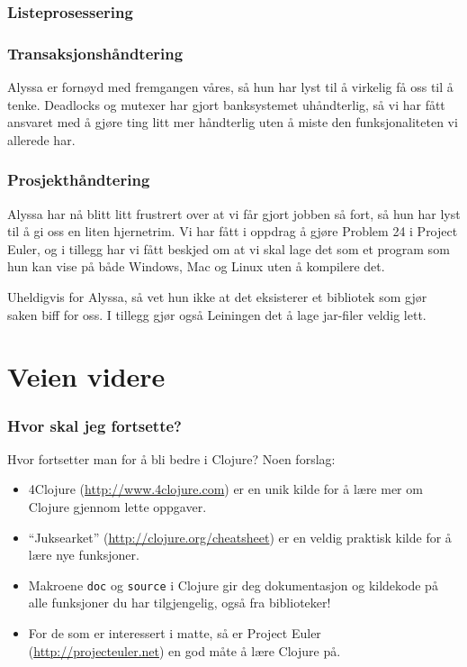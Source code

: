 \documentclass{beamer}
\begin{document}
\begin{frame}
  \frametitle{Listeprosessering}

\end{frame}

\begin{frame}
  \frametitle{Transaksjonshåndtering}

  Alyssa er fornøyd med fremgangen våres, så hun har lyst til å virkelig få oss
  til å tenke. Deadlocks og mutexer har gjort banksystemet uhåndterlig, så vi
  har fått ansvaret med å gjøre ting litt mer håndterlig uten å miste den
  funksjonaliteten vi allerede har.
\end{frame}

\begin{frame}
  \frametitle{Prosjekthåndtering}

  Alyssa har nå blitt litt frustrert over at vi får gjort jobben så fort, så hun
  har lyst til å gi oss en liten hjernetrim. Vi har fått i oppdrag å gjøre
  Problem 24 i Project Euler, og i tillegg har vi fått beskjed om at vi skal
  lage det som et program som hun kan vise på både Windows, Mac og Linux uten å
  kompilere det.

  Uheldigvis for Alyssa, så vet hun ikke at det eksisterer et bibliotek som gjør
  saken biff for oss. I tillegg gjør også Leiningen det å lage jar-filer veldig
  lett.
\end{frame}

\section{Veien videre}

\begin{frame}
  \frametitle{Hvor skal jeg fortsette?}
  Hvor fortsetter man for å bli bedre i Clojure? Noen forslag:
  \begin{itemize}
  \item<+-> 4Clojure (\url{http://www.4clojure.com}) er en unik kilde for å
    lære mer om Clojure gjennom lette oppgaver.
  \item<+-> ``Juksearket'' (\url{http://clojure.org/cheatsheet}) er en veldig
    praktisk kilde for å lære nye funksjoner.
  \item<+-> Makroene {\tt doc} og {\tt source} i Clojure gir deg dokumentasjon
    og kildekode på alle funksjoner du har tilgjengelig, også fra biblioteker!
  \item<+-> For de som er interessert i matte, så er Project Euler
    (\url{http://projecteuler.net}) en god måte å lære Clojure på.
  \end{itemize}
\end{frame}
\end{document}
